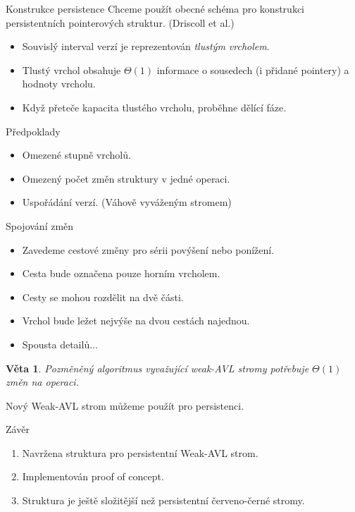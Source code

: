 \documentclass{beamer}
\theoremstyle{mytheoremstyle}
\newtheorem{thm}{Věta}
\begin{document}
\begin{frame}{Konstrukce persistence}
Chceme použít obecné schéma pro konstrukci persistentních pointerových struktur. (Driscoll et al.)

\begin{itemize}
\item
Souvislý interval verzí je reprezentován \emph{tlustým vrcholem}. 
\item 
Tlustý vrchol obsahuje $\Theta(1)$ informace o sousedech (i přidané pointery) a hodnoty vrcholu.
\item
Když přeteče kapacita tlustého vrcholu, proběhne dělící fáze.
\end{itemize}

\pause

\begin{block}{Předpoklady}
\begin{itemize}
  \item {\color{green!80!black}Omezené stupně vrcholů.}
  \item {\color{red}Omezený počet změn struktury v jedné operaci.}
  \item Uspořádání verzí. (Váhově vyváženým stromem)
\end{itemize}
\end{block}

\end{frame}

\begin{frame}{Spojování změn}
\begin{itemize}
\item Zavedeme cestové změny pro sérii povýšení nebo ponížení.
\item Cesta bude označena pouze horním vrcholem.
\item Cesty se mohou rozdělit na dvě části.
\item Vrchol bude ležet nejvýše na dvou cestách najednou.
\item Spousta detailů...
\end{itemize}

\pause

\begin{thm}
Pozměněný algoritmus vyvažující weak-AVL stromy potřebuje $\Theta(1)$ změn na operaci.
\end{thm}

Nový Weak-AVL strom můžeme použít pro persistenci.
\end{frame}

\begin{frame}{Závěr}
\begin{enumerate}
\item
Navržena struktura pro persistentní Weak-AVL strom.
\item
Implementován proof of concept.
\item
Struktura je ještě složitější než persistentní červeno-černé stromy.
\end{enumerate}
\end{frame}
\end{document}
